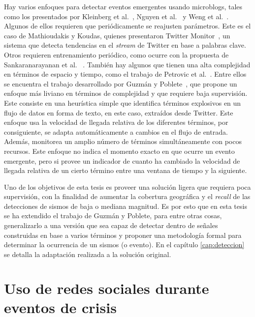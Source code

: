 Hay varios enfoques para detectar eventos emergentes usando microblogs, tales como los presentados por Kleinberg et al.~\cite{kleinberg2003bursty}, Nguyen et al.~\cite{nguyen2013event} y Weng et al.~\cite{weng2011event}.
%
Algunos de ellos requieren que periódicamente se reajusten parámetros. Este es el caso de Mathioudakis y Koudas, quienes presentaron Twitter Monitor~\cite{mathioudakis2010twittermonitor}, un sistema que detecta tendencias en el {\em stream} de Twitter en base a palabras clave.
%
Otros requieren entrenamiento periódico, como ocurre con la propuesta de Sankaranarayanan et al.~ \cite{sankaranarayanan2009twitterstand}. 
%
También hay algunos que tienen una alta complejidad en términos de espacio y tiempo, como el trabajo de Petrovic et al.~\cite{petrovic2010streaming}.
%
Entre ellos se encuentra el trabajo desarrollado por Guzmán y Poblete~\cite{guzman2013line}, que propone un enfoque más liviano en términos de complejidad y que requiere baja supervisión.
%
Este consiste en una heurística simple que identifica términos explosivos en un flujo de datos en forma de texto, en este caso, extraídos desde Twitter. 
%
Este enfoque usa la velocidad de llegada relativa de los diferentes términos, por consiguiente, se adapta automáticamente a cambios en el flujo de entrada. 
%
Además, monitorea un amplio número de términos simultáneamente con pocos recursos.
%
Este enfoque no indica el momento exacto en que ocurre un evento emergente, pero si provee un indicador de cuanto ha cambiado la velocidad de llegada relativa de un cierto término entre una ventana de tiempo y la siguiente.


Uno de los objetivos de esta tesis es proveer una solución ligera que requiera poca supervisión, con la finalidad de aumentar la cobertura geográfica y el {\em recall} de las detecciones de sismos de baja o mediana magnitud.
%
Es por esto que en esta tesis se ha extendido el trabajo de Guzmán y Poblete, para entre otras cosas, generalizarlo a una versión que sea capaz de detectar dentro de señales construidas en base a varios términos y proponer una metodología formal para determinar la ocurrencia de un sismos (o evento).
%
En el capítulo \ref{cap:deteccion} se detalla la adaptación realizada a la solución original. 

\section{Uso de redes sociales durante eventos de crisis}
\label{sec:desastres}

